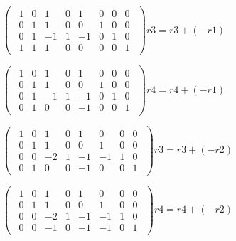 \singlespacing

\begin{math}
    \begin{pmatrix}
        \begin{array}{cccc|cccc}
            1 & 0 & 1  & 0 & 1  & 0 & 0 & 0 \\
            0 & 1 & 1  & 0 & 0  & 1 & 0 & 0 \\
            0 & 1 & -1 & 1 & -1 & 0 & 1 & 0 \\
            1 & 1 & 1  & 0 & 0  & 0 & 0 & 1
        \end{array}
    \end{pmatrix}
    r3 = r3  + (-r1)
\end{math}

\singlespacing

\begin{math}
    \begin{pmatrix}
        \begin{array}{cccc|cccc}
            1 & 0 & 1  & 0 & 1  & 0 & 0 & 0 \\
            0 & 1 & 1  & 0 & 0  & 1 & 0 & 0 \\
            0 & 1 & -1 & 1 & -1 & 0 & 1 & 0 \\
            0 & 1 & 0  & 0 & -1 & 0 & 0 & 1
        \end{array}
    \end{pmatrix}
    r4 = r4  + (-r1)
\end{math}

\singlespacing

\begin{math}
    \begin{pmatrix}
        \begin{array}{cccc|cccc}
            1 & 0 & 1  & 0 & 1  & 0  & 0 & 0 \\
            0 & 1 & 1  & 0 & 0  & 1  & 0 & 0 \\
            0 & 0 & -2 & 1 & -1 & -1 & 1 & 0 \\
            0 & 1 & 0  & 0 & -1 & 0  & 0 & 1
        \end{array}
    \end{pmatrix}
    r3 = r3  + (-r2)
\end{math}


\singlespacing

\begin{math}
    \begin{pmatrix}
        \begin{array}{cccc|cccc}
            1 & 0 & 1  & 0 & 1  & 0  & 0 & 0 \\
            0 & 1 & 1  & 0 & 0  & 1  & 0 & 0 \\
            0 & 0 & -2 & 1 & -1 & -1 & 1 & 0 \\
            0 & 0 & -1 & 0 & -1 & -1 & 0 & 1
        \end{array}
    \end{pmatrix}
    r4 = r4  + (-r2)
\end{math}

